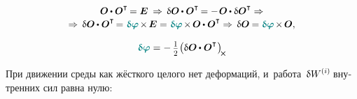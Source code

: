 \begin{otherlanguage}{russian}
\nopagebreak\vspace{-0.5em}\begin{multline*}
\scalebox{0.98}{$ \rotationtensor \hspace{-0.1ex} \dotp \rotationtensor^{\T} \hspace{-0.2ex} = \bm{E}
\:\Rightarrow\,
\variation{\rotationtensor} \hspace{-0.1ex} \dotp \rotationtensor^{\T} \hspace{-0.2ex}
= - \hspace{.2ex} \rotationtensor \hspace{-0.1ex} \dotp \variation{\rotationtensor}^{\T}
\Rightarrow $}
\\[-0.15em]
%
\scalebox{0.98}{$ \Rightarrow\,
\variation{\rotationtensor} \hspace{-0.1ex} \dotp \rotationtensor^{\T} \hspace{-0.25ex}
= \hspace{.1ex} \littlerotationvector \hspace{-0.2ex} \times \hspace{-0.2ex} \bm{E}
= \hspace{.1ex} \littlerotationvector \hspace{-0.2ex} \times \hspace{-0.2ex} \rotationtensor \hspace{-0.1ex} \dotp \rotationtensor^{\T}
\Rightarrow\,
\variation{\rotationtensor} \hspace{-0.1ex} = \littlerotationvector \hspace{-0.2ex} \times \hspace{-0.2ex} \rotationtensor , $}
\end{multline*}

\vspace{-0.4em}\begin{equation*}
\littlerotationvector = - \, \smalldisplaystyleonehalf \hspace{.1ex}
\scalebox{1}{$ \left( \variation{\rotationtensor} \hspace{-0.1ex} \dotp^{\mathstrut} \hspace{-0.1ex} \rotationtensor^{\T} \hspace{.1ex} \right)_{\hspace{-0.15em}\Xcompanion} $}
\end{equation*}

\vspace{-0.1em} При движении среды как жёсткого целого нет деформаций, и~работа~$\variation{\internalwork}\hspace{-0.2ex}$ внутренних сил равна нулю:


\end{otherlanguage}
